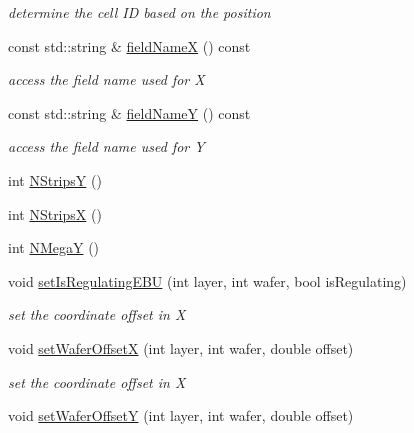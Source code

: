 \begin{DoxyCompactItemize}
\begin{DoxyCompactList}\small\item\em determine the cell ID based on the position \end{DoxyCompactList}\item 
const std\+::string \& \hyperlink{class_d_d4hep_1_1_d_d_segmentation_1_1_megatile_layer_grid_x_y_a7cf0375cf22dcf10a668e6fe87cda777}{field\+NameX} () const
\begin{DoxyCompactList}\small\item\em access the field name used for X \end{DoxyCompactList}\item 
const std\+::string \& \hyperlink{class_d_d4hep_1_1_d_d_segmentation_1_1_megatile_layer_grid_x_y_a791434189dbb5aa773f6c9dc2b64f504}{field\+NameY} () const
\begin{DoxyCompactList}\small\item\em access the field name used for Y \end{DoxyCompactList}\item 
int \hyperlink{class_d_d4hep_1_1_d_d_segmentation_1_1_megatile_layer_grid_x_y_a66306093675275c371f813c48fb39d70}{N\+StripsY} ()
\item 
int \hyperlink{class_d_d4hep_1_1_d_d_segmentation_1_1_megatile_layer_grid_x_y_a6004cfbffa52b347d04d12a0bd0657c0}{N\+StripsX} ()
\item 
int \hyperlink{class_d_d4hep_1_1_d_d_segmentation_1_1_megatile_layer_grid_x_y_ac5c3cbce77f0b432cc597689fab38c59}{N\+MegaY} ()
\item 
void \hyperlink{class_d_d4hep_1_1_d_d_segmentation_1_1_megatile_layer_grid_x_y_a7d696e7cba091370935d23b62c79ae9c}{set\+Is\+Regulating\+E\+BU} (int layer, int wafer, bool is\+Regulating)
\begin{DoxyCompactList}\small\item\em set the coordinate offset in X \end{DoxyCompactList}\item 
void \hyperlink{class_d_d4hep_1_1_d_d_segmentation_1_1_megatile_layer_grid_x_y_a8683c7d9ed5d4b02f79748d1bb16d935}{set\+Wafer\+OffsetX} (int layer, int wafer, double offset)
\begin{DoxyCompactList}\small\item\em set the coordinate offset in X \end{DoxyCompactList}\item 
void \hyperlink{class_d_d4hep_1_1_d_d_segmentation_1_1_megatile_layer_grid_x_y_a4c17519c8f2abe47ea3b2a6d534871fa}{set\+Wafer\+OffsetY} (int layer, int wafer, double offset)

\end{DoxyCompactItemize}
